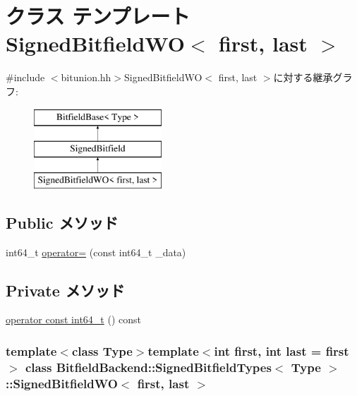 \hypertarget{classBitfieldBackend_1_1SignedBitfieldTypes_1_1SignedBitfieldWO}{
\section{クラス テンプレート SignedBitfieldWO$<$ first, last $>$}
\label{classBitfieldBackend_1_1SignedBitfieldTypes_1_1SignedBitfieldWO}
}


{\ttfamily \#include $<$bitunion.hh$>$}SignedBitfieldWO$<$ first, last $>$に対する継承グラフ:\begin{figure}[H]
\begin{center}
\leavevmode
\includegraphics[height=3cm]{classBitfieldBackend_1_1SignedBitfieldTypes_1_1SignedBitfieldWO}
\end{center}
\end{figure}
\subsection*{Public メソッド}
\begin{DoxyCompactItemize}
\item 
int64\_\-t \hyperlink{classBitfieldBackend_1_1SignedBitfieldTypes_1_1SignedBitfieldWO_aa9c1202c4f5162c5214e708c80d5d4c8}{operator=} (const int64\_\-t \_\-data)
\end{DoxyCompactItemize}
\subsection*{Private メソッド}
\begin{DoxyCompactItemize}
\item 
\hyperlink{classBitfieldBackend_1_1SignedBitfieldTypes_1_1SignedBitfieldWO_a44fb8a8077f66f5a72d1c16acfc80f9c}{operator const int64\_\-t} () const 
\end{DoxyCompactItemize}
\subsubsection*{template$<$class Type$>$template$<$int first, int last = first$>$ class BitfieldBackend::SignedBitfieldTypes$<$ Type $>$::SignedBitfieldWO$<$ first, last $>$}



